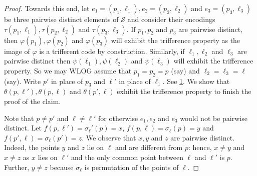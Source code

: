 \documentclass[10pt,a4paper]{article}
\DeclareMathOperator{\1}{\mathbf{1}}
\begin{document}
\begin{proof}
	Towards this end, let $e_1 = (p_1, \ell_1), e_2 = (p_2, \ell_2)$ and $e_3 = (p_3, \ell_3)$ be three pairwise distinct elements of $\mathcal S$ and consider their encodings $\tau(p_1,\ell_1),\tau(p_2,\ell_2) \text{ and } \tau(p_3,\ell_3)$. 
	If $p_1, p_2$ and $p_3$ are pairwise distinct, then $\varphi(p_1), \varphi(p_2)$ and $\varphi(p_3)$ will exhibit the trifference property as the image of $\varphi$ is a trifferent code by construction.
	Similarly, if $\ell_1, \ell_2$ and $\ell_3$ are pairwise distinct then $\psi(\ell_1), \psi(\ell_2)$  and $\psi(\ell_3)$ will exhibit the trifference property.
	So we may WLOG assume that $p_1 = p_2 = p$ (say) and $\ell_2 = \ell_3 = \ell$ (say).
	Write $p'$ in place of $p_3$ and $\ell'$ in place of $\ell_1$. See \cref{fig:two_points_two_lines}. 
    We show that $\theta(p, \ell'), \theta(p, \ell)$ and $\theta(p', \ell)$ exhibit the trifference property to finish the proof of the claim.
\begin{figure}[H]
\centering
{}
\label{fig:two_points_two_lines}
\end{figure}    

	Note that $p\neq p'$ and $\ell\neq \ell'$ for otherwise $e_1, e_2$ and $e_3$ would not be pairwise distinct.
	Let $f(p, \ell') = \sigma_\ell'(p) =  x$, $f(p, \ell) = \sigma_\ell(p) =  y$ and $f(p', \ell) = \sigma_\ell(p') =z$.
	We observe that $x, y$ and $z$ are pairwise distinct.
	Indeed, the points $y$ and $z$ lie on $\ell$ and are different from $p$: hence, $x\neq y$ and $x\neq z$ as $x$ lies on $\ell'$ and the only common point between $\ell$ and $\ell'$ is $p$. Further, $y\neq z$ because $\sigma_\ell$ is permutation of the points of $\ell$.
 

\end{proof}
\end{document}
